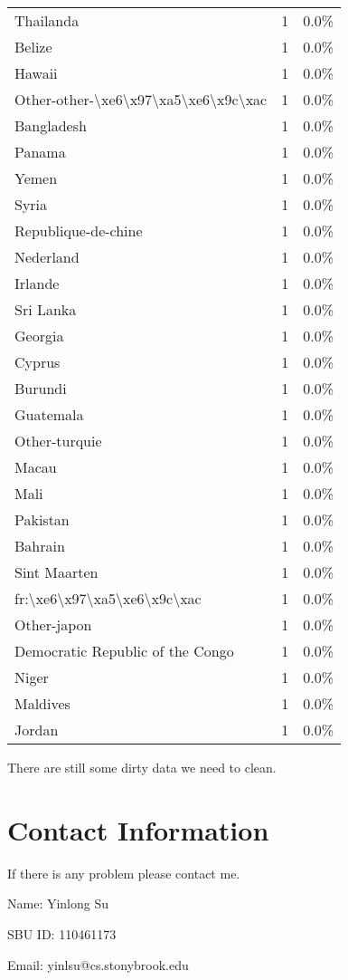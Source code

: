 \documentclass[11pt]{article}
\begin{document}
\begin{center}
\begin{longtable}{|l|c|r|}
Thailanda& 1& 0.0\%\\
Belize& 1& 0.0\%\\
Hawaii& 1& 0.0\%\\
Other-other-\textbackslash xe6\textbackslash x97\textbackslash xa5\textbackslash xe6\textbackslash x9c\textbackslash xac& 1& 0.0\%\\
Bangladesh& 1& 0.0\%\\
Panama& 1& 0.0\%\\
Yemen& 1& 0.0\%\\
Syria& 1& 0.0\%\\
Republique-de-chine& 1& 0.0\%\\
Nederland& 1& 0.0\%\\
Irlande& 1& 0.0\%\\
Sri Lanka& 1& 0.0\%\\
Georgia& 1& 0.0\%\\
Cyprus& 1& 0.0\%\\
Burundi& 1& 0.0\%\\
Guatemala& 1& 0.0\%\\
Other-turquie& 1& 0.0\%\\
Macau& 1& 0.0\%\\
Mali& 1& 0.0\%\\
Pakistan& 1& 0.0\%\\
Bahrain& 1& 0.0\%\\
Sint Maarten& 1& 0.0\%\\
fr:\textbackslash xe6\textbackslash x97\textbackslash xa5\textbackslash xe6\textbackslash x9c\textbackslash xac& 1& 0.0\%\\
Other-japon& 1& 0.0\%\\
Democratic Republic of the Congo& 1& 0.0\%\\
Niger& 1& 0.0\%\\
Maldives& 1& 0.0\%\\
Jordan& 1& 0.0\%\\


\hline

\end{longtable}
\end{center}

\par
There are still some dirty data we need to clean.

\section{Contact Information}
If there is any problem please contact me.
\par
Name: Yinlong Su
\par
SBU ID: 110461173
\par
Email: yinlsu@cs.stonybrook.edu
\end{document}
